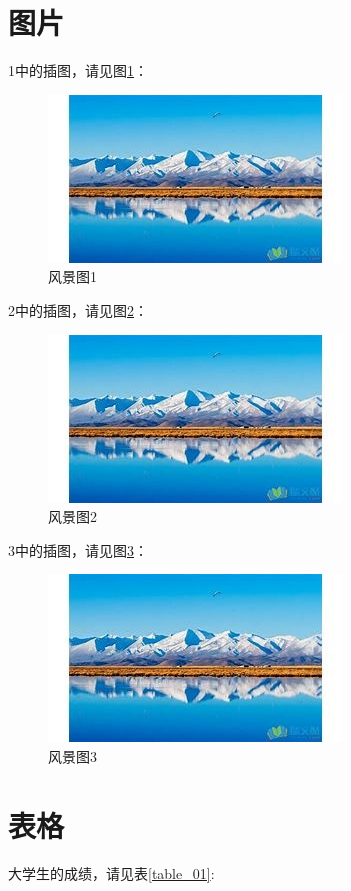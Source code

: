 \documentclass{ctexart}
\begin{document}
	
	\section{图片}
	\LaTeXe{}1中的插图，请见图\ref{figure_01}：
	\begin{figure}[htbp]	%
		\centering
		\includegraphics[scale = 2]{view}
		\caption{风景图1}	%
		\label{figure_01}	%
	\end{figure}

	\LaTeXe{}2中的插图，请见图\ref{figure_02}：
	\begin{figure}[htbp]	%
		\centering
		\includegraphics[scale = 2]{view}
		\caption{风景图2}	%
		\label{figure_02}	%
	\end{figure}

	\LaTeXe{}3中的插图，请见图\ref{figure_03}：
	\begin{figure}[htbp]	%
		\centering
		\includegraphics[scale = 2]{view}
		\caption{风景图3}	%
		\label{figure_03}	%
	\end{figure}
	
	
	\section{表格}	%
	大学生的成绩，请见表\ref{table_01}:
	
\end{document}
